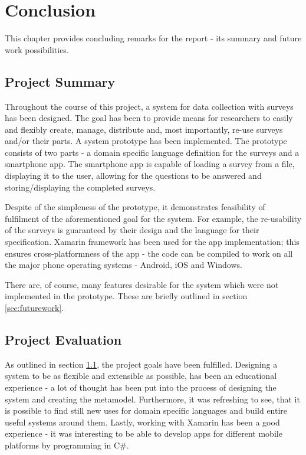 \chapter{Conclusion}
\label{chap:conclusion}
This chapter provides concluding remarks for the report - its summary and future work possibilities.

\section{Project Summary}
\label{sec:summary}
Throughout the course of this project, a system for data collection with surveys has been designed. The goal has been to provide means for researchers to easily and flexibly create, manage, distribute and, most importantly, re-use surveys and/or their parts. 
A system prototype has been implemented. The prototype consists of two parts - a domain specific language definition for the surveys and a smartphone app. The smartphone app is capable of loading a survey from a file, displaying it to the user, allowing for the questions to be answered and storing/displaying the completed surveys.

Despite of the simpleness of the prototype, it demonstrates feasibility of fulfilment of the aforementioned goal for the system. For example, the re-usability of the surveys is guaranteed by their design and the language for their specification. Xamarin framework has been used for the app implementation; this ensures cross-platformness of the app - the code can be compiled to work on all the major phone operating systems - Android, iOS and Windows.

There are, of course, many features desirable for the system which were not implemented in the prototype. These are briefly outlined in section \ref{sec:futurework}.

\section{Project Evaluation}
\label{sec:evaluation}
As outlined in section \ref{sec:summary}, the project goals have been fulfilled. Designing a system to be as flexible and extensible as possible, has been an educational experience - a lot of thought has been put into the process of designing the system and creating the metamodel. Furthermore, it was refreshing to see, that it is possible to find still new uses for domain specific languages and build entire useful systems around them. Lastly, working with Xamarin has been a good experience - it was interesting to be able to develop apps for different mobile platforms by programming in C\#.

